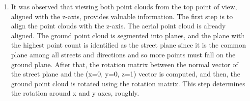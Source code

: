 \documentclass[11pt]{article}
\begin{document}
    \begin{enumerate}
        \item It was observed that viewing both point clouds from the top point of view, aligned with the z-axis, provides
        valuable information. The first step is to align the point clouds with the z-axis. The aerial
        point cloud is already aligned. The ground point cloud is segmented into planes, and the plane
        with the highest point count is identified as the street plane since it is the common plane among
        all streets and directions and so more points must fall on the ground plane. After that,
        the rotation matrix between the normal vector of the street plane and the (x=0, y=0, z=1) vector
        is computed, and then, the ground point cloud is rotated using the rotation matrix.
        This step determines the rotation around x and y axes, roughly.


\end{enumerate}
\end{document}
